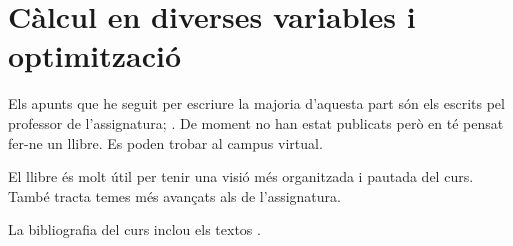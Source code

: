 \documentclass[./segon.tex]{subfiles}
\begin{document}
\part{Càlcul en diverses variables i optimització}



\printbibliography
Els apunts que he seguit per escriure la majoria d'aquesta part són els escrits pel professor de l'assignatura; \cite{ApuntsBrunaEspai, ApuntsBrunaDiff, ApuntsBrunaInt, ApuntsBrunaVect}.
De moment no han estat publicats però en té pensat fer-ne un llibre.
Es poden trobar al campus virtual.

El llibre \cite{apostol1974mathematical} és molt útil per tenir una visió més organitzada i pautada del curs.
També tracta temes més avançats als de l'assignatura.

La bibliografia del curs inclou els textos \cite{MarsdenTrombaCalculoVectorial, WendellFlemingFSoV, BressoudDavidSecondYearCalculus}.
\end{document}
